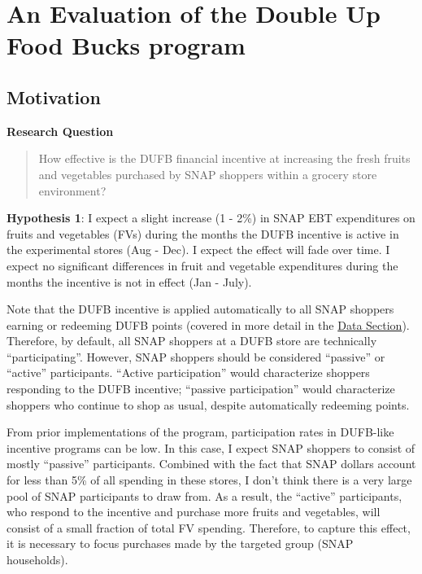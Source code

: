 \documentclass[12pt,letterpaperpaper,]{book}
\begin{document}
\chapter{An Evaluation of the Double Up Food Bucks
program}\label{chapter-1}

\section*{Motivation}\label{motivation}

\textbf{Research Question}

\begin{quote}
How effective is the DUFB financial incentive at increasing the fresh
fruits and vegetables purchased by SNAP shoppers within a grocery store
environment?
\end{quote}

\textbf{Hypothesis 1}: I expect a slight increase (1 - 2\%) in SNAP EBT
expenditures on fruits and vegetables (FVs) during the months the DUFB
incentive is active in the experimental stores (Aug - Dec). I expect the
effect will fade over time. I expect no significant differences in fruit
and vegetable expenditures during the months the incentive is not in
effect (Jan - July).

Note that the DUFB incentive is applied automatically to all SNAP
shoppers earning or redeeming DUFB points (covered in more detail in the
\protect\hyperlink{data-1}{Data Section}). Therefore, by default, all
SNAP shoppers at a DUFB store are technically ``participating''.
However, SNAP shoppers should be considered ``passive'' or ``active''
participants. ``Active participation'' would characterize shoppers
responding to the DUFB incentive; ``passive participation'' would
characterize shoppers who continue to shop as usual, despite
automatically redeeming points.

From prior implementations of the program, participation rates in
DUFB-like incentive programs can be low. In this case, I expect SNAP
shoppers to consist of mostly ``passive'' participants. Combined with
the fact that SNAP dollars account for less than 5\% of all spending in
these stores, I don't think there is a very large pool of SNAP
participants to draw from. As a result, the ``active'' participants, who
respond to the incentive and purchase more fruits and vegetables, will
consist of a small fraction of total FV spending. Therefore, to capture
this effect, it is necessary to focus purchases made by the targeted
group (SNAP households).
\end{document}
